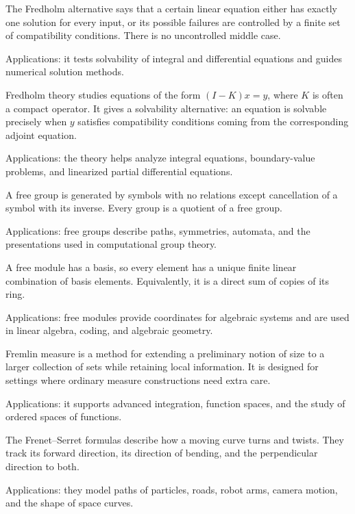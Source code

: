 The Fredholm alternative says that a certain linear equation either has exactly one solution for every input, or its possible failures are controlled by a finite set of compatibility conditions. There is no uncontrolled middle case. \par\noindent Applications: it tests solvability of integral and differential equations and guides numerical solution methods.

Fredholm theory studies equations of the form $(I-K)x=y$, where $K$ is often a compact operator. It gives a solvability alternative: an equation is solvable precisely when $y$ satisfies compatibility conditions coming from the corresponding adjoint equation. \par\noindent Applications: the theory helps analyze integral equations, boundary-value problems, and linearized partial differential equations.

A free group is generated by symbols with no relations except cancellation of a symbol with its inverse. Every group is a quotient of a free group. \par\noindent Applications: free groups describe paths, symmetries, automata, and the presentations used in computational group theory.

A free module has a basis, so every element has a unique finite linear combination of basis elements. Equivalently, it is a direct sum of copies of its ring. \par\noindent Applications: free modules provide coordinates for algebraic systems and are used in linear algebra, coding, and algebraic geometry.

Fremlin measure is a method for extending a preliminary notion of size to a larger collection of sets while retaining local information. It is designed for settings where ordinary measure constructions need extra care. \par\noindent Applications: it supports advanced integration, function spaces, and the study of ordered spaces of functions.

The Frenet--Serret formulas describe how a moving curve turns and twists. They track its forward direction, its direction of bending, and the perpendicular direction to both. \par\noindent Applications: they model paths of particles, roads, robot arms, camera motion, and the shape of space curves.

